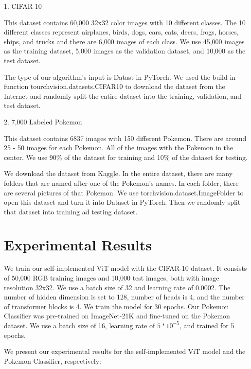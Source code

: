 \documentclass{article} %
\begin{document}
1. CIFAR-10

This dataset contains 60,000 32x32 color images with 10 different classes. The 10 different 
classes represent airplanes, birds, dogs, cars, cats, deers, frogs, horses, ships, and trucks 
and there are 6,000 images of each class. We use 45,000 images as the training dataset, 
5,000 images as the validation dataset, and 10,000 as the test dataset.

The type of our algorithm's input is Datast in PyTorch. We used the build-in function 
tourchvision.datasets.CIFAR10 to download the dataset from the Internet and randomly split 
the entire dataset into the training, validation, and test dataset. 

2. 7,000 Labeled Pokemon

This dataset contains 6837 images with 150 different Pokemon. There are around 25 - 50 
images for each Pokemon. All of the images with the Pokemon in the center. We use 90\% of 
the dataset for training and 10\% of the dataset for testing.

We download the dataset from Kaggle. In the entire dataset, there are many folders that 
are named after one of the Pokemon's names. In each folder, there are several pictures 
of that Pokemon. We use torchvision.dataset.ImageFolder to open this dataset and turn it 
into Dataset in PyTorch. Then we randomly split that dataset into training ad testing 
dataset.


\section{Experimental Results}
\label{headings}
We train our self-implemented ViT model with the CIFAR-10 dataset. It consists of 50,000 RGB training images
and 10,000 test images, both with image resolution 32x32. We use a batch size of 32 and learning rate of 0.0002. The number of 
hidden dimension is set to 128, number of heads is 4, and the number of transformer blocks is 4. We train the model for 30 
epochs. Our Pokemon Classifier was pre-trained on ImageNet-21K and fine-tuned on the Pokemon dataset. We use a 
batch size of 16, learning rate of $5 * 10^{-5}$, and trained for 5 epochs.

We present our experimental results for the self-implemented ViT model and the Pokemon Classifier, respectively:

\end{document}
